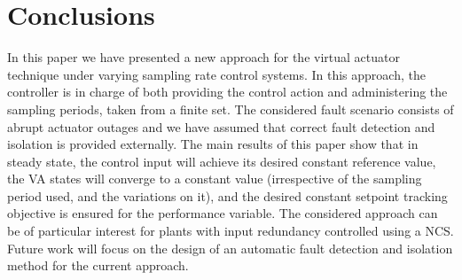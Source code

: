 \documentclass[letterpaper, 10 pt, conference]{ieeeconf}
\begin{document}
\section{Conclusions}
\label{sec:conclusions}
In this paper we have presented a new approach for the virtual
actuator technique under varying sampling rate control systems.  In
this approach, the controller is in charge of both providing the
control action and administering the sampling periods, taken from a
finite set. The considered fault scenario consists of abrupt actuator
outages and we have assumed that correct fault detection and isolation
is provided externally.
The main results of this paper show that in steady state, the control
input will achieve its desired constant reference value, the VA states
will converge to a constant value (irrespective of the sampling period
used, and the variations on it), and the desired constant setpoint
tracking objective is ensured for the performance variable.
The considered approach can be of particular interest for plants with
input redundancy controlled using a NCS. Future work will focus on the
design of an automatic fault detection and isolation method for the
current approach.
\end{document}
